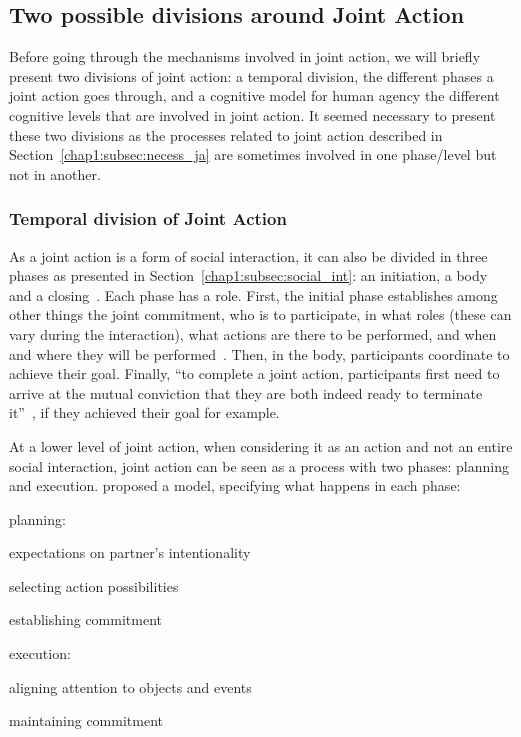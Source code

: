 \documentclass[a4paper,11pt,twoside]{StyleThese}
\begin{document}
\subsection{Two possible divisions around Joint Action}

Before going through the mechanisms involved in joint action, we will briefly present two divisions of joint action: a temporal division, \ie the different phases a joint action goes through, and a cognitive model for human agency \ie the different cognitive levels that are involved in joint action. It seemed necessary to present these two divisions as the processes related to joint action described in Section~\ref{chap1:subsec:necess_ja} are sometimes involved in one phase/level but not in another. 

\subsubsection{Temporal division of Joint Action}
As a joint action is a form of social interaction, it can also be divided in three phases as presented in Section~\ref{chap1:subsec:social_int}: an initiation, a body and a closing~\citep{heesen_2017_social}. Each phase has a role. First, the initial phase establishes among other things the joint commitment, \ie who is to participate, in what roles (these can vary during the interaction), what actions are there to be performed, and when and where they will be performed~\citep{clark_2006_social}. Then, in the body, participants coordinate to achieve their goal. Finally, ``to complete a joint action, participants first need to arrive at the mutual conviction that they are both indeed ready to terminate it''~\citep[p.~392]{heesen_2017_social}, if they achieved their goal for example.

At a lower level of joint action, when considering it as an action and not an entire social interaction, joint action can be seen as a process with two phases: planning and execution. \cite{curioni_2017_joint} proposed a model, specifying what happens in each phase: 
\begin{bulletList}
	\item planning: 
	\begin{bulletList}
		\item expectations on partner's intentionality
		\item selecting action possibilities
		\item establishing commitment
	\end{bulletList}
	\item execution:
	\begin{bulletList}
		\item aligning attention to objects and events
		\item maintaining commitment
	\end{bulletList}
\end{bulletList}
\end{document}
